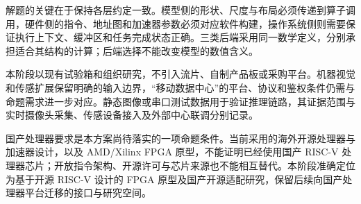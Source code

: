 解题的关键在于保持各层约定一致。模型侧的形状、尺度与布局必须传递到算子调用，硬件侧的指令、地址图和加速器参数必须对应软件构建，操作系统侧则需要保证执行上下文、缓冲区和任务完成状态正确。三类后端采用同一数学定义，分别承担适合其结构的计算；后端选择不能改变模型的数值含义。\cite{technicalreport}

本阶段以现有试验箱和\TargetCost{}组织研究，不引入流片、自制产品板或采购平台。机器视觉和传感扩展保留明确的输入边界，“移动数据中心”的平台、协议和鉴权条件仍需与命题需求进一步对应。静态图像或串口测试数据用于验证推理链路，其证据范围与实时摄像头采集、传感设备接入及外部中心联调分别记录。

国产处理器要求是本方案尚待落实的一项命题条件。当前采用的海外开源处理器与加速器设计，以及 AMD/Xilinx FPGA 原型，不能证明已经使用国产 RISC-V 处理器芯片；开放指令架构、开源许可与芯片来源也不能相互替代。本阶段准确定位为基于开源 RISC-V 设计的 FPGA 原型及国产开源\RealTimeSystem{}适配研究，保留后续向国产处理器平台迁移的接口与研究空间。\cite{technicalreport}
